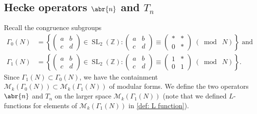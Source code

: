 \documentclass[10pt,leqno,twoside,b5paper]{article}
\theoremstyle{plain}
\theoremstyle{definition}
\numberwithin{equation}{section}
\numberwithin{lem}{section}
\newcommand{\cbr}[1]{\left\{#1\right\}}
\DeclareMathOperator{\SL}{SL}
\newcommand{\smod}[1]{\;(\bmod\; #1)}
\newcommand{\abcd}{\begin{pmatrix}
    a & b \\ c & d
\end{pmatrix}}
\newcommand{\slz}{\SL_2(\mathbb{Z})}
\begin{document}
\subsection{Hecke operators $\abr{n}$ and $T_n$}
Recall the congruence subgroups \begin{align*}
    \varGamma_0(N) &= \cbr{\abcd\in\slz: \abcd\equiv\begin{pmatrix}
        \ast & \ast \\ 0 & \ast
    \end{pmatrix}\smod N}\text{ and}\\
    \varGamma_1(N) &= \cbr{\abcd\in \slz: \begin{pmatrix}
        a & b \\ c & d 
    \end{pmatrix}\equiv \begin{pmatrix}
        1 & \ast \\ 0 & 1
    \end{pmatrix}\smod N}.
\end{align*} Since $\varGamma_1(N)\subset 
\varGamma_0(N)$, we have the containment $\mathcal M_k(\varGamma_0(N))\subset \mathcal M_k(\varGamma_1(N))$ of modular forms. We define the two operators $\abr{n}$ and $T_n$ on the larger space $\mathcal M_k(\varGamma_1(N))$ (note that we defined $L$-functions for elements of $\mathcal M_k(\varGamma_1(N))$ in \cref{def: L function}).
\end{document}
